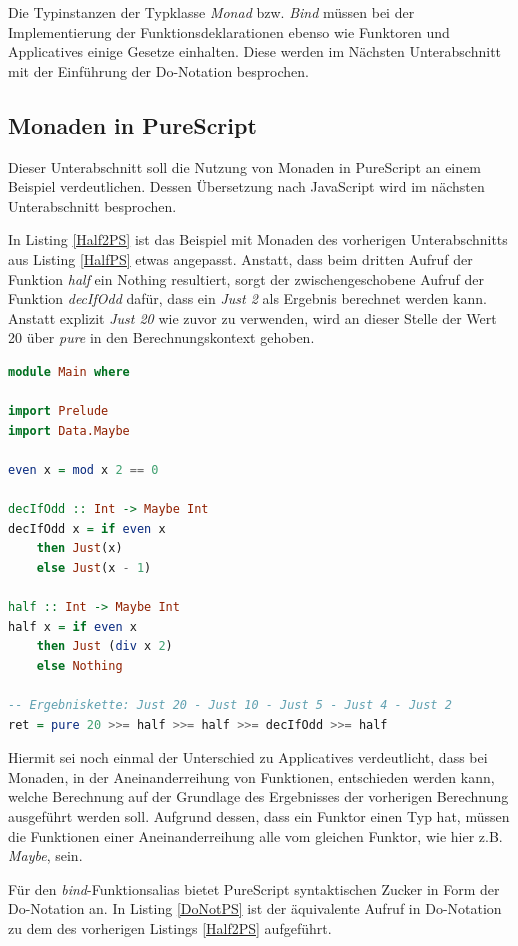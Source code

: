 \documentclass[
12pt,
ngerman,
oneside]
{scrbook} %
\begin{document}
Die Typinstanzen der Typklasse \emph{Monad} bzw. \emph{Bind} müssen bei der Implementierung der Funktionsdeklarationen ebenso wie Funktoren und Applicatives einige Gesetze einhalten. Diese werden im Nächsten Unterabschnitt mit der Einführung der Do-Notation besprochen.

\subsection{Monaden in PureScript}
Dieser Unterabschnitt soll die Nutzung von Monaden in PureScript an einem Beispiel verdeutlichen. Dessen Übersetzung nach JavaScript wird im nächsten Unterabschnitt besprochen.

In Listing \ref{Half2PS} ist das Beispiel mit Monaden des vorherigen Unterabschnitts aus Listing \ref{HalfPS} etwas angepasst. Anstatt, dass beim dritten Aufruf der Funktion \emph{half} ein Nothing resultiert, sorgt der zwischengeschobene Aufruf der Funktion \emph{decIfOdd} dafür, dass ein \emph{Just 2} als Ergebnis berechnet werden kann. Anstatt explizit \emph{Just 20} wie zuvor zu verwenden, wird an dieser Stelle der Wert 20 über \emph{pure} in den Berechnungskontext gehoben.

\begin{lstlisting}[language=purescript, style=numbered-and-boxed, caption=Funktionen mit Monad-Anwendung, label=Half2PS]
module Main where

import Prelude
import Data.Maybe

even x = mod x 2 == 0

decIfOdd :: Int -> Maybe Int
decIfOdd x = if even x
	then Just(x)
	else Just(x - 1)

half :: Int -> Maybe Int
half x = if even x
	then Just (div x 2)
	else Nothing

-- Ergebniskette: Just 20 - Just 10 - Just 5 - Just 4 - Just 2
ret = pure 20 >>= half >>= half >>= decIfOdd >>= half 
\end{lstlisting}

Hiermit sei noch einmal der Unterschied zu Applicatives verdeutlicht, dass bei Monaden, in der Aneinanderreihung von Funktionen, entschieden werden kann, welche Berechnung auf der Grundlage des Ergebnisses der vorherigen Berechnung ausgeführt werden soll. Aufgrund dessen, dass ein Funktor einen Typ hat, müssen die Funktionen einer Aneinanderreihung alle vom gleichen Funktor, wie hier z.B. \emph{Maybe}, sein.

Für den \emph{bind}-Funktionsalias bietet PureScript syntaktischen Zucker in Form der Do-Notation an. In Listing \ref{DoNotPS} ist der äquivalente Aufruf in Do-Notation zu dem des vorherigen Listings \ref{Half2PS} aufgeführt.
\end{document}
